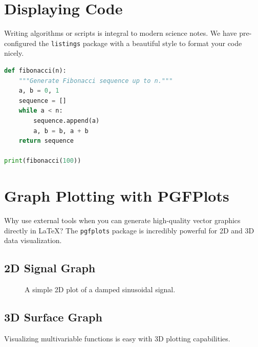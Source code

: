 \section{Displaying Code}
Writing algorithms or scripts is integral to modern science notes. We have pre-configured the \texttt{listings} package with a beautiful style to format your code nicely. 

\begin{lstlisting}[language=Python, caption={Calculating the Fibonacci sequence}]
def fibonacci(n):
    """Generate Fibonacci sequence up to n."""
    a, b = 0, 1
    sequence = []
    while a < n:
        sequence.append(a)
        a, b = b, a + b
    return sequence

print(fibonacci(100))
\end{lstlisting}

\section{Graph Plotting with PGFPlots}
Why use external tools when you can generate high-quality vector graphics directly in \LaTeX? The \texttt{pgfplots} package is incredibly powerful for 2D and 3D data visualization.

\subsection{2D Signal Graph}
\begin{figure}[H]
    \centering
    \caption{A simple 2D plot of a damped sinusoidal signal.}
\end{figure}

\subsection{3D Surface Graph}
Visualizing multivariable functions is easy with 3D plotting capabilities.

